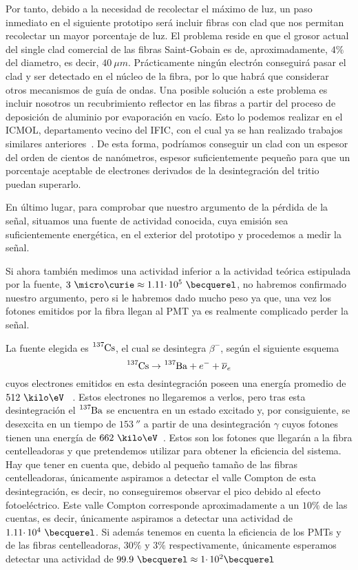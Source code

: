 Por tanto, debido a la necesidad de recolectar el máximo de luz, un paso inmediato en el siguiente prototipo será incluir fibras con clad que nos permitan recolectar un mayor porcentaje de luz. El problema reside en que el grosor actual del single clad comercial de las fibras Saint-Gobain es de, aproximadamente, $4\%$ del diametro, es decir, $40~\mu m$. Prácticamente ningún electrón conseguirá pasar el clad y ser detectado en el núcleo de la fibra, por lo que habrá que considerar otros mecanismos de guía de ondas. Una posible solución a este problema es incluir nosotros un recubrimiento reflector en las fibras a partir del proceso de deposición de aluminio por evaporación en vacío. Esto lo podemos realizar en el ICMOL, departamento vecino del IFIC, con el cual ya se han realizado trabajos similares anteriores~\cite{cladtesis,cladarticulo}. De esta forma, podríamos conseguir un clad con un espesor del orden de cientos de nanómetros, espesor suficientemente pequeño para que un porcentaje aceptable de electrones derivados de la desintegración del tritio puedan superarlo. 

En último lugar, para comprobar que nuestro argumento de la pérdida de la señal, situamos una fuente de actividad conocida, cuya emisión sea suficientemente energética, en el exterior del prototipo y procedemos a medir la señal. 

Si ahora también medimos una actividad inferior a la actividad teórica estipulada por la fuente, $3~\micro\curie \approx 1.11 \cdotp 10^{5}~\becquerel$, no habremos confirmado nuestro argumento, pero si le habremos dado mucho peso ya que, una vez los fotones emitidos por la fibra llegan al PMT ya es realmente complicado perder la señal. 

La fuente elegida es $\ce{^{137}Cs}$, el cual se desintegra $\beta^{-}$, según el siguiente esquema
\begin{equation}
\ce{^{137}Cs} \rightarrow \ce{^{137}Ba} + e^- + \overline{\nu}_e
\label{desintegracionbeta}
\end{equation}
cuyos electrones emitidos en esta desintegración poseen una energía promedio de $512~\kilo\eV$ ~\cite{Isotopos}. Estos electrones no llegaremos a verlos, pero tras esta desintegración el $\ce{^{137}Ba}$ se encuentra en un estado excitado y, por consiguiente, se desexcita en un tiempo de $153~\second$  a partir de una desintegración $\gamma$ cuyos fotones tienen una energía de $662~\kilo\eV$~\cite{Isotopos}. Estos son los fotones que llegarán a la fibra centelleadoras y que pretendemos utilizar para obtener la eficiencia del sistema. Hay que tener en cuenta que, debido al pequeño tamaño de las fibras centelleadoras, únicamente aspiramos a detectar el valle Compton de esta desintegración, es decir, no conseguiremos observar el pico debido al efecto fotoeléctrico. Este valle Compton corresponde aproximadamente a un $10\%$ de las cuentas, es decir, únicamente aspiramos a detectar una actividad de $1.11 \cdotp 10^{4}~\becquerel$. Si además tenemos en cuenta la eficiencia de los PMTs y de las fibras centelleadoras, $30\%$ y $3\%$ respectivamente, únicamente esperamos detectar una actividad de $99.9~\becquerel \approx 1 \cdotp 10^{2} \becquerel$

